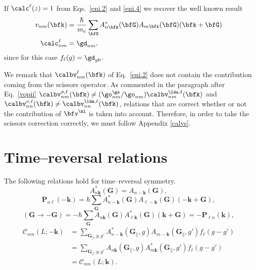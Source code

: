If $\calc^\ell(z)=1$ from Eqs.~\eqref{eni.2} and \eqref{eni.4}
we recover the well known
result
\begin{align}\label{eni.21}
  v_{nm}(\bfk)&=
\frac{\hbar}{m_e}
\sum_{\bfG} A^*_{n\bfk}(\bfG)  A_{m\bfk}(\bfG)
(\bfk+\bfG)
\nonumber\\
\calc^\ell_{nm}&=\gd_{nm}
,
\end{align}  
since for this case $f_\ell(g)=\gd_{g0}$.

We remark that $\calbv^\ell_{nm}(\bfk)$ of Eq.~\eqref{eni.2} does not
contain the contribution coming from the scissors operator.
As commented in the paragraph after Eq.~\eqref{vopii}
$\calbv^{\sigma,\ell}_{nm}(\bfk)\ne
(\go^\gs_{nm}/\go_{nm})
\calbv^{\lda,\ell}_{nm}(\bfk)$ 
and
$\calbv^{\sigma,\ell}_{nn}(\bfk)\ne
\calbv^{\lda,\ell}_{nn}(\bfk)$,
relations that are correct whether or not the contribution of
$\bfv^\nl$ is taken into account.
Therefore, in order to take the scissors correction correctly, we must
follow Appendix \ref{calvs}.


\section{Time--reversal relations}
The following relations hold for time--reversal symmetry.
\begin{equation*}
A_{n\mathbf{k}}^{*}(\mathbf{G}) = A_{n-\mathbf{k}}(\mathbf{G}),
\end{equation*}
\begin{equation*}
\mathbf{P}_{n\ell }(-\mathbf{k}) 
=   \hbar\sum_{\mathbf{G}}
    A_{n-\mathbf{k}}^{*}(\mathbf{G})
    A_{\ell -\mathbf{k}}(\mathbf{G})(-\mathbf{k}+\mathbf{G}),
\end{equation*}
\begin{equation*}
(\mathbf{G}\rightarrow-\mathbf{G})
=   -\hbar\sum_{\mathbf{G}}
    A_{n\mathbf{k}}(\mathbf{G})
    A_{\ell\mathbf{k}}^{*}(\mathbf{G})(\mathbf{k}+\mathbf{G})
=   -\mathbf{P}_{\ell n}(\mathbf{k}),
\end{equation*}
\begin{align*}
\mathcal{C}_{nm} (L;-\mathbf{k}) 
&=  \sum_{\mathbf{G}_{\parallel},g,g'}
    A_{n-\mathbf{k}}^{*}(\mathbf{G}_{\parallel},g)
    A_{m-\mathbf{k}}(\mathbf{G}_{\parallel},g')
    f_{\ell}(g-g') \\
&=  \sum_{\mathbf{G}_{\parallel},g,g'}
    A_{n\mathbf{k}} (\mathbf{G}_{\parallel},g)
    A_{m\mathbf{k}}^{*} (\mathbf{G}_{\parallel},g')
    f_{\ell}(g-g') \\
&=  \mathcal{C}_{mn}(L;\mathbf{k}).
\end{align*}
